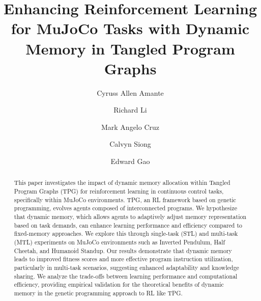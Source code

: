 \documentclass[sigconf]{acmart}
\begin{document}
\title[Dynamic Memory in Tangled Program Graphs]{Enhancing Reinforcement Learning for MuJoCo Tasks with Dynamic Memory in Tangled Program Graphs}

\author{Cyruss Allen Amante}

\author{Richard Li}

\author{Mark Angelo Cruz}

\author{Calvyn Siong}

\author{Edward Gao}


\begin{abstract}
  This paper investigates the impact of dynamic memory allocation within 
  Tangled Program Graphs (TPG) for reinforcement learning in continuous control 
  tasks, specifically within MuJoCo environments. TPG, an RL framework based on 
  genetic programming, evolves agents composed of interconnected programs. 
  We hypothesize that dynamic memory, which allows agents to adaptively adjust 
  memory representation based on task demands, can enhance learning performance 
  and efficiency compared to fixed-memory approaches. We explore this through 
  single-task (STL) and multi-task (MTL) experiments on MuJoCo environments such as Inverted 
  Pendulum, Half Cheetah, and Humanoid Standup. Our results demonstrate that dynamic 
  memory leads to improved fitness scores and more effective program instruction utilization, 
  particularly in multi-task scenarios, suggesting enhanced adaptability and knowledge sharing. 
  We analyze the trade-offs between learning performance and computational efficiency, 
  providing empirical validation for the theoretical benefits of dynamic memory in 
  the genetic programming approach to RL like TPG.
\end{abstract}
\end{document}
